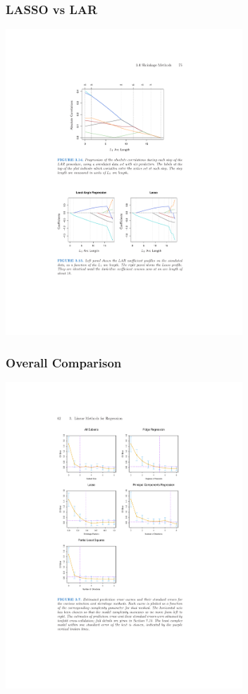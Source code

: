 \documentclass[xcolor=pdftex,dvipsnames,table,mathserif,aspectratio=169]{beamer}
\begin{document}
\begin{frame}
\frametitle{LASSO vs LAR}
\begin{center}
\includegraphics[width=3.5in]{./resources/lar-lasso}
\end{center}
\end{frame}

\begin{frame}
\frametitle{Overall Comparison}
\begin{center}
\includegraphics[width=3.5in]{./resources/comparisons}
\end{center}
\end{frame}
\end{document}
